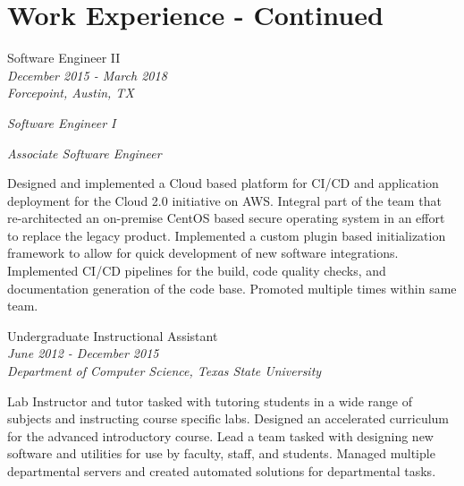 \documentclass[10pt]{article} %
\begin{document}
\begin{minipage}[t]{0.5\textwidth} %
\vspace{0pt} %
\section{Work Experience - Continued} 



{
\raggedright\large  Software Engineer II\\
\textit{December 2015 - March 2018}\\
\textit{Forcepoint, Austin, TX}\\
\raggedright\small \textit{Software Engineer I}\\
\raggedright\small \textit{Associate Software Engineer}\\
[5pt]
}

\normalsize{Designed and implemented a Cloud based platform for CI/CD and application deployment for the Cloud 2.0 initiative on AWS. Integral part of the team that re-architected an on-premise CentOS based secure operating system in an effort to replace the legacy product. Implemented a custom plugin based initialization framework to allow for quick development of new software integrations. Implemented CI/CD pipelines for the build, code quality checks, and documentation generation of the code base. Promoted multiple times within same team.}\\

{\raggedright\large Undergraduate Instructional Assistant\\
\textit{June 2012 - December 2015} \\
\textit{Department of Computer Science, Texas State University}\\[5pt]}

\normalsize{Lab Instructor and tutor tasked with tutoring students in a wide range of subjects and instructing course specific labs. Designed an accelerated curriculum for the advanced introductory course. Lead a team tasked with designing new software and utilities for use by faculty, staff, and students. Managed multiple departmental servers and created automated solutions for departmental tasks.}\\

\end{minipage}
\end{document}
